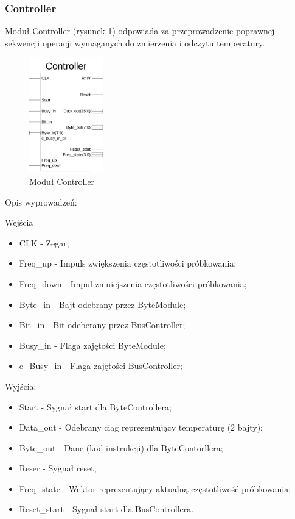 \documentclass[a4paper]{article}
\begin{document}
\subsubsection{Controller}


Moduł Controller (rysunek \ref{controller_sym}) odpowiada za przeprowadzenie poprawnej sekwencji operacji wymaganych do zmierzenia i odczytu temperatury.

\begin{figure}[!h]
\begin{center}
\includegraphics[height=5cm]{graphics/controller_sym.png}
\end{center}
\caption{Moduł Controller}
\label{controller_sym}
\end{figure}

Opis wyprowadzeń:

Wejścia
\begin{itemize}
\item CLK - Zegar;
\item Freq\_up - Impuls zwiększenia częstotliwości próbkowania;
\item Freq\_down - Impul zmniejszenia częstotliwości próbkowania;
\item Byte\_in - Bajt odebrany przez ByteModule;
\item Bit\_in - Bit odeberany przez BusController;
\item Busy\_in - Flaga zajętości ByteModule;
\item c\_Busy\_in - Flaga zajętości BusController;
\end{itemize}

Wyjścia:
\begin{itemize}
\item Start - Sygnał start dla ByteControllera;
\item Data\_out - Odebrany ciag reprezentujący temperaturę (2 bajty);
\item Byte\_out - Dane (kod instrukcji) dla ByteContorllera;
\item Reser - Sygnał reset;
\item Freq\_state - Wektor reprezentujący aktualną częstotliwość próbkowania;
\item Reset\_start - Sygnał start dla BusControllera. 
\end{itemize}
\end{document}
